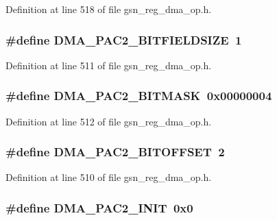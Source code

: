 Definition at line 518 of file gsn\_\-reg\_\-dma\_\-op.h.

\hypertarget{a00547_a52048befe5b9124eb26a89bf2ecc1e70}{
\subsubsection[{DMA\_\-PAC2\_\-BITFIELDSIZE}]{\setlength{\rightskip}{0pt plus 5cm}\#define DMA\_\-PAC2\_\-BITFIELDSIZE~1}}
\label{a00547_a52048befe5b9124eb26a89bf2ecc1e70}


Definition at line 511 of file gsn\_\-reg\_\-dma\_\-op.h.

\hypertarget{a00547_a8f1e8594124d2ea615ed054eeda05934}{
\subsubsection[{DMA\_\-PAC2\_\-BITMASK}]{\setlength{\rightskip}{0pt plus 5cm}\#define DMA\_\-PAC2\_\-BITMASK~0x00000004}}
\label{a00547_a8f1e8594124d2ea615ed054eeda05934}


Definition at line 512 of file gsn\_\-reg\_\-dma\_\-op.h.

\hypertarget{a00547_a9342ba6285d494612a2d4344ed4066c4}{
\subsubsection[{DMA\_\-PAC2\_\-BITOFFSET}]{\setlength{\rightskip}{0pt plus 5cm}\#define DMA\_\-PAC2\_\-BITOFFSET~2}}
\label{a00547_a9342ba6285d494612a2d4344ed4066c4}


Definition at line 510 of file gsn\_\-reg\_\-dma\_\-op.h.

\hypertarget{a00547_a5a5806a142faf81c12709459dcd1dff9}{
\subsubsection[{DMA\_\-PAC2\_\-INIT}]{\setlength{\rightskip}{0pt plus 5cm}\#define DMA\_\-PAC2\_\-INIT~0x0}}
\label{a00547_a5a5806a142faf81c12709459dcd1dff9}


